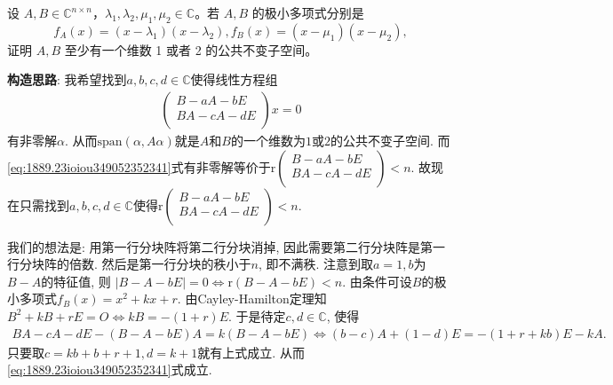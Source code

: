 \documentclass[../../main.tex]{subfiles}%
\begin{document}
\begin{proposition}\label{proposition:二次极小多项式由单因式分解必存在公共不变子空间}
设 \( A,B \in \mathbb{C}^{n \times n} \)，\( \lambda_1,\lambda_2,\mu_1,\mu_2 \in \mathbb{C} \)。若 \( A,B \) 的极小多项式分别是
\[ f_A(x) = (x - \lambda_1)(x - \lambda_2), f_B(x) = (x - \mu_1)(x - \mu_2), \]
证明 \( A,B \) 至少有一个维数 1 或者 2 的公共不变子空间。
\end{proposition}
\begin{note}
\textbf{构造思路}: 我希望找到$a,b,c,d\in \mathbb{C}$使得线性方程组
\begin{align}
\left( \begin{array}{c}
B-aA-bE\\
BA-cA-dE\\
\end{array} \right) x=0 \label{eq:1889.23ioiou349052352341}
\end{align}
有非零解$\alpha$. 从而$\mathrm{span}\left( \alpha ,A\alpha \right)$就是$A$和$B$的一个维数为$1$或$2$的公共不变子空间. 而\eqref{eq:1889.23ioiou349052352341}式有非零解等价于$\mathrm{r}\left( \begin{array}{c}
B-aA-bE\\
BA-cA-dE\\
\end{array} \right) <n$. 故现在只需找到$a,b,c,d\in \mathbb{C}$使得$\mathrm{r}\left( \begin{array}{c}
B-aA-bE\\
BA-cA-dE\\
\end{array} \right) <n$.

我们的想法是: 用第一行分块阵将第二行分块消掉, 因此需要第二行分块阵是第一行分块阵的倍数.
然后是第一行分块的秩小于$n$, 即不满秩. 注意到取$a=1,b$为$B-A$的特征值, 则
$| B-A-bE |=0\Longleftrightarrow \mathrm{r}\left( B-A-bE \right) <n.$
由条件可设$B$的极小多项式$f_B\left( x \right) =x^2+kx+r$. 由Cayley-Hamilton定理知
$B^2+kB+rE=O\Longleftrightarrow kB=-\left( 1+r \right) E.$
于是待定$c,d\in \mathbb{C}$, 使得
\begin{align*}
BA-cA-dE-\left( B-A-bE \right) A=k\left( B-A-bE \right) 
\Longleftrightarrow \left( b-c \right) A+\left( 1-d \right) E=-\left( 1+r+kb \right) E-kA.
\end{align*}
只要取$c=kb+b+r+1,d=k+1$就有上式成立. 从而\eqref{eq:1889.23ioiou349052352341}式成立.
\end{note}
\end{document}
